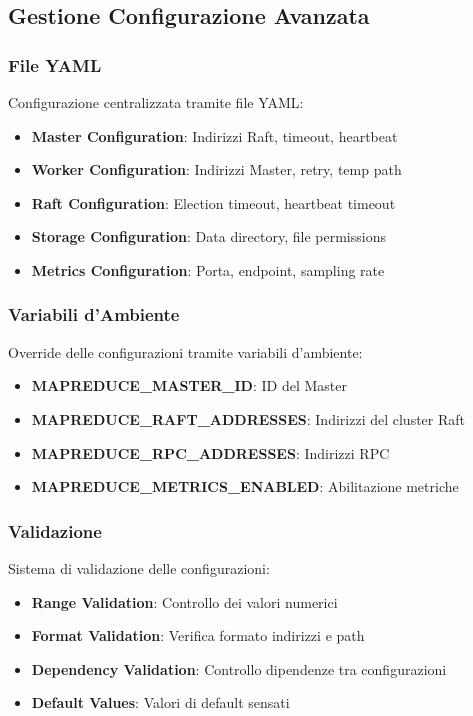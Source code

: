 \documentclass[12pt,a4paper]{article}
\begin{document}
\subsection{Gestione Configurazione Avanzata}

\subsubsection{File YAML}

Configurazione centralizzata tramite file YAML:

\begin{itemize}
\item \textbf{Master Configuration}: Indirizzi Raft, timeout, heartbeat
\item \textbf{Worker Configuration}: Indirizzi Master, retry, temp path
\item \textbf{Raft Configuration}: Election timeout, heartbeat timeout
\item \textbf{Storage Configuration}: Data directory, file permissions
\item \textbf{Metrics Configuration}: Porta, endpoint, sampling rate
\end{itemize}

\subsubsection{Variabili d'Ambiente}

Override delle configurazioni tramite variabili d'ambiente:

\begin{itemize}
\item \textbf{MAPREDUCE\_MASTER\_ID}: ID del Master
\item \textbf{MAPREDUCE\_RAFT\_ADDRESSES}: Indirizzi del cluster Raft
\item \textbf{MAPREDUCE\_RPC\_ADDRESSES}: Indirizzi RPC
\item \textbf{MAPREDUCE\_METRICS\_ENABLED}: Abilitazione metriche
\end{itemize}

\subsubsection{Validazione}

Sistema di validazione delle configurazioni:

\begin{itemize}
\item \textbf{Range Validation}: Controllo dei valori numerici
\item \textbf{Format Validation}: Verifica formato indirizzi e path
\item \textbf{Dependency Validation}: Controllo dipendenze tra configurazioni
\item \textbf{Default Values}: Valori di default sensati
\end{itemize}
\end{document}
